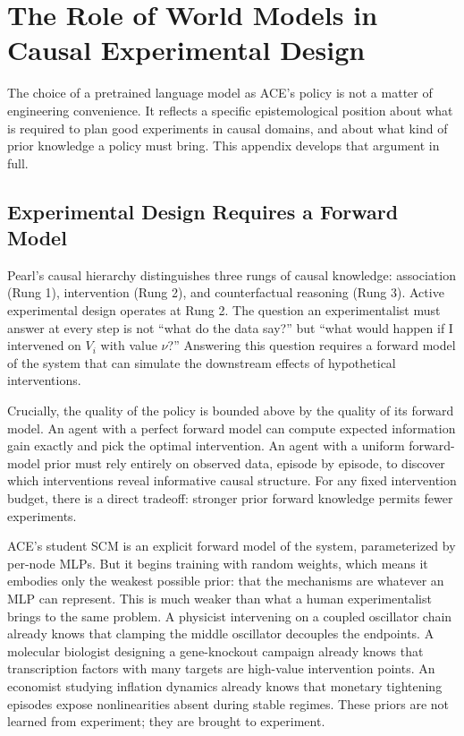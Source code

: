 
\section{The Role of World Models in Causal Experimental Design}
\label{app:world-models}

The choice of a pretrained language model as ACE's policy is not a matter of engineering convenience. It reflects a specific epistemological position about what is required to plan good experiments in causal domains, and about what kind of prior knowledge a policy must bring. This appendix develops that argument in full.

\subsection{Experimental Design Requires a Forward Model}

Pearl's causal hierarchy \citep{pearl2009causality,pearl2018book} distinguishes three rungs of causal knowledge: association (Rung 1), intervention (Rung 2), and counterfactual reasoning (Rung 3). Active experimental design operates at Rung 2. The question an experimentalist must answer at every step is not ``what do the data say?'' but ``what would happen if I intervened on $V_i$ with value $\nu$?'' Answering this question requires a forward model of the system that can simulate the downstream effects of hypothetical interventions.

Crucially, the quality of the policy is bounded above by the quality of its forward model. An agent with a perfect forward model can compute expected information gain exactly and pick the optimal intervention. An agent with a uniform forward-model prior must rely entirely on observed data, episode by episode, to discover which interventions reveal informative causal structure. For any fixed intervention budget, there is a direct tradeoff: stronger prior forward knowledge permits fewer experiments.

ACE's student SCM is an explicit forward model of the system, parameterized by per-node MLPs. But it begins training with random weights, which means it embodies only the weakest possible prior: that the mechanisms are whatever an MLP can represent. This is much weaker than what a human experimentalist brings to the same problem. A physicist intervening on a coupled oscillator chain already knows that clamping the middle oscillator decouples the endpoints. A molecular biologist designing a gene-knockout campaign already knows that transcription factors with many targets are high-value intervention points. An economist studying inflation dynamics already knows that monetary tightening episodes expose nonlinearities absent during stable regimes. These priors are not learned from experiment; they are brought to experiment.

